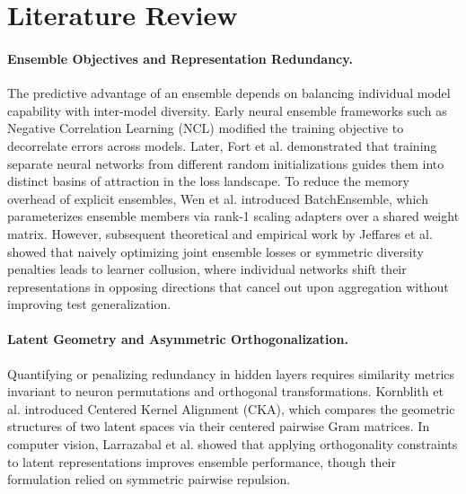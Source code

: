 \documentclass[11pt, a4paper]{article}
\begin{document}
\section{Literature Review}

\paragraph{Ensemble Objectives and Representation Redundancy.}
The predictive advantage of an ensemble depends on balancing individual model capability with inter-model diversity. Early neural ensemble frameworks such as Negative Correlation Learning (NCL) \cite{liu1999ensemble} modified the training objective to decorrelate errors across models. Later, Fort et al. \cite{fort2019deep} demonstrated that training separate neural networks from different random initializations guides them into distinct basins of attraction in the loss landscape. To reduce the memory overhead of explicit ensembles, Wen et al. \cite{wen2020batchensemble} introduced BatchEnsemble, which parameterizes ensemble members via rank-1 scaling adapters over a shared weight matrix. However, subsequent theoretical and empirical work by Jeffares et al. \cite{jeffares2023joint} showed that naively optimizing joint ensemble losses or symmetric diversity penalties leads to learner collusion, where individual networks shift their representations in opposing directions that cancel out upon aggregation without improving test generalization.

\paragraph{Latent Geometry and Asymmetric Orthogonalization.}
Quantifying or penalizing redundancy in hidden layers requires similarity metrics invariant to neuron permutations and orthogonal transformations. Kornblith et al. \cite{kornblith2019similarity} introduced Centered Kernel Alignment (CKA), which compares the geometric structures of two latent spaces via their centered pairwise Gram matrices. In computer vision, Larrazabal et al. \cite{larrazabal2021orthogonal} showed that applying orthogonality constraints to latent representations improves ensemble performance, though their formulation relied on symmetric pairwise repulsion.
\end{document}
